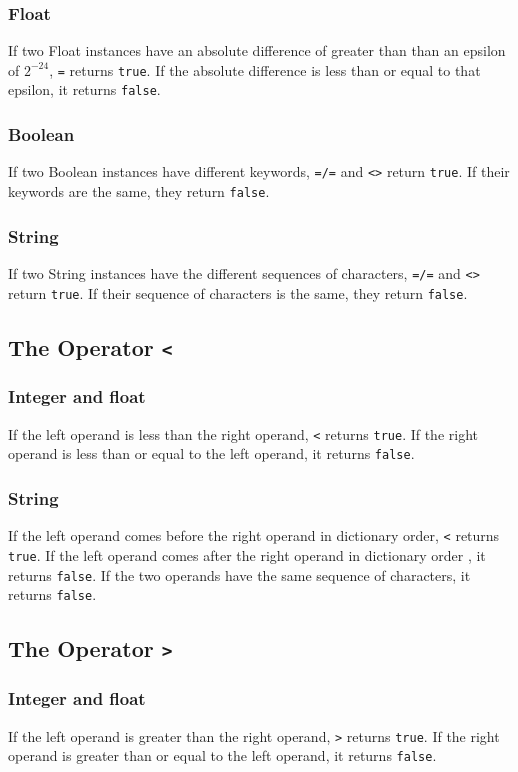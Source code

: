 \subsubsection{Float}
If two Float instances have an absolute difference of greater than than an epsilon of $2^{-24}$, \verb!=! returns \verb!true!. If the absolute difference is less than or equal to that epsilon, it returns \verb!false!.
\subsubsection{Boolean}
If two Boolean instances have different keywords, \verb!=/=! and \verb!<>! return \verb!true!. If their keywords are the same, they return \verb!false!.
\subsubsection{String}
If two String instances have the different sequences of characters, \verb!=/=! and \verb!<>! return \verb!true!. If their sequence of characters is the same, they return \verb!false!.

\subsection{The Operator {\tt <}}
\subsubsection{Integer and float}
If the left operand is less than the right operand, \verb!<! returns \verb!true!. If the right operand is less than or equal to the left operand, it returns \verb!false!.
\subsubsection{String}
If the left operand comes before the right operand in dictionary order, \verb!<! returns \verb!true!. If the left operand comes after the right operand in dictionary order , it returns \verb!false!. If the two operands have the same sequence of characters, it returns \verb!false!.

\subsection{The Operator {\tt >}}
\subsubsection{Integer and float}
If the left operand is greater than the right operand, \verb!>! returns \verb!true!. If the right operand is greater than or equal to the left operand, it returns \verb!false!.
